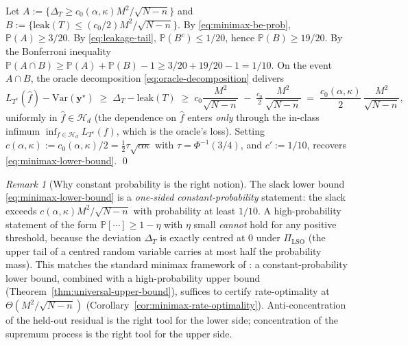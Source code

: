 \documentclass[11pt,a4paper]{article}
\theoremstyle{plain}
\theoremstyle{definition}
\theoremstyle{remark}
\newtheorem{remark}[theorem]{Remark}
\newcommand{\by}{\mathbf{y}}
\newcommand{\PR}{\mathbb{P}}
\newcommand{\Var}{\mathrm{Var}}
\newcommand{\Hcal}{\mathcal{H}}
\begin{document}
Let $A := \{\Delta_T \ge c_0(\alpha,\kappa) M^2/\sqrt{N-n}\}$ and
$B := \{\mathrm{leak}(T) \le (c_0/2) M^2/\sqrt{N-n}\}$.  By
\eqref{eq:minimax-be-prob}, $\PR(A) \ge 3/20$.  By
\eqref{eq:leakage-tail}, $\PR(B^c) \le 1/20$, hence $\PR(B) \ge 19/20$.
By the Bonferroni inequality
$\PR(A \cap B) \ge \PR(A) + \PR(B) - 1 \ge 3/20 + 19/20 - 1 = 1/10$.
On the event $A \cap B$, the oracle decomposition
\eqref{eq:oracle-decomposition} delivers
\[
    L_{T^c}(\hat f) - \Var(\by^\star)
    \;\ge\; \Delta_T - \mathrm{leak}(T)
    \;\ge\; c_0\frac{M^2}{\sqrt{N-n}} \;-\; \tfrac{c_0}{2}\,\frac{M^2}{\sqrt{N-n}}
    \;=\; \frac{c_0(\alpha,\kappa)}{2}\,\frac{M^2}{\sqrt{N - n}},
\]
uniformly in $\hat f \in \Hcal_d$ (the dependence on $\hat f$
enters \emph{only} through the in-class infimum $\inf_{f \in \Hcal_d}
L_{T^c}(f)$, which is the oracle's loss).  Setting
$c(\alpha,\kappa) := c_0(\alpha,\kappa)/2 = \tfrac{1}{2}\tau\sqrt{\alpha\kappa}$
with $\tau = \Phi^{-1}(3/4)$, and $c' := 1/10$, recovers
\eqref{eq:minimax-lower-bound}. \qed

\begin{remark}[Why constant probability is the right notion]
\label{rem:constant-probability}
The slack lower bound \eqref{eq:minimax-lower-bound} is a
\emph{one-sided constant-probability} statement: the slack exceeds
$c(\alpha,\kappa) M^2/\sqrt{N-n}$ with probability at least $1/10$.
A high-probability statement of the form $\PR[\cdots] \ge 1-\eta$
with $\eta$ small \emph{cannot} hold for any positive threshold,
because the deviation $\Delta_T$ is exactly centred at $0$ under
$\Pi_{\mathrm{LSO}}$ (the upper tail of a centred random variable
carries at most half the probability mass).  This matches the
standard minimax framework of \citet{Tsybakov2009}: a
constant-probability lower bound, combined with a
high-probability upper bound (Theorem~\ref{thm:universal-upper-bound}),
suffices to certify rate-optimality at $\Theta(M^2/\sqrt{N-n})$
(Corollary~\ref{cor:minimax-rate-optimality}). Anti-concentration
of the held-out residual is the right tool for the lower side;
concentration of the supremum process is the right tool for the
upper side.
\end{remark}
\end{document}
